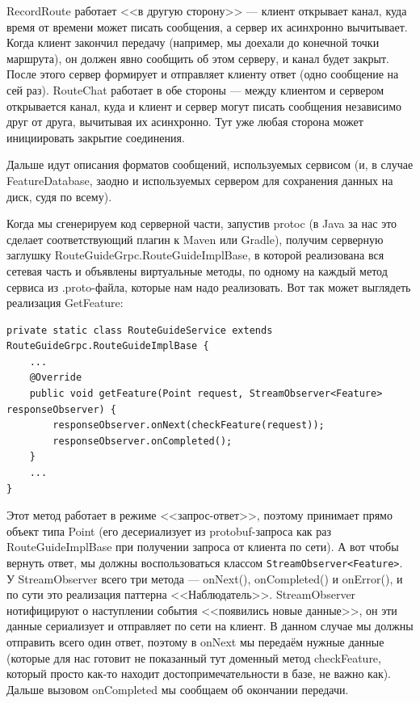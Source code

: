 \documentclass{../../text-style}
\begin{document}
RecordRoute работает <<в другую сторону>> --- клиент открывает канал, куда время от времени может писать сообщения, а сервер их асинхронно вычитывает. Когда клиент закончил передачу (например, мы доехали до конечной точки маршрута), он должен явно сообщить об этом серверу, и канал будет закрыт. После этого сервер формирует и отправляет клиенту ответ (одно сообщение на сей раз). RouteChat работает в обе стороны --- между клиентом и сервером открывается канал, куда и клиент и сервер могут писать сообщения независимо друг от друга, вычитывая их асинхронно. Тут уже любая сторона может инициировать закрытие соединения.

Дальше идут описания форматов сообщений, используемых сервисом (и, в случае FeatureDatabase, заодно и используемых сервером для сохранения данных на диск, судя по всему).

Когда мы сгенерируем код серверной части, запустив protoc (в Java за нас это сделает соответствующий плагин к Maven или Gradle), получим серверную заглушку RouteGuideGrpc.RouteGuideImplBase, в которой реализована вся сетевая часть и объявлены виртуальные методы, по одному на каждый метод сервиса из .proto-файла, которые нам надо реализовать. Вот так может выглядеть реализация GetFeature:

\begin{verbatim}
private static class RouteGuideService extends RouteGuideGrpc.RouteGuideImplBase {
    ...
    @Override
    public void getFeature(Point request, StreamObserver<Feature> responseObserver) {
        responseObserver.onNext(checkFeature(request));
        responseObserver.onCompleted();
    }
    ...
}
\end{verbatim}

Этот метод работает в режиме <<запрос-ответ>>, поэтому принимает прямо объект типа Point (его десериализует из protobuf-запроса как раз RouteGuideImplBase при получении запроса от клиента по сети). А вот чтобы вернуть ответ, мы должны воспользоваться классом \texttt{StreamObserver<Feature>}. У StreamObserver всего три метода --- onNext(), onCompleted() и onError(), и по сути это реализация паттерна <<Наблюдатель>>. StreamObserver нотифицируют о наступлении события <<появились новые данные>>, он эти данные сериализует и отправляет по сети на клиент. В данном случае мы должны отправить всего один ответ, поэтому в onNext мы передаём нужные данные (которые для нас готовит не показанный тут доменный метод checkFeature, который просто как-то находит достопримечательности в базе, не важно как). Дальше вызовом onCompleted мы сообщаем об окончании передачи.
\end{document}
